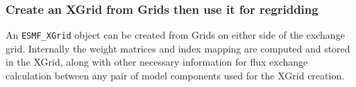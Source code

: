  
\setlength{\oldparskip}{\parskip}
\setlength{\parskip}{1.5ex}
\setlength{\oldparindent}{\parindent}
\setlength{\parindent}{0pt}
\setlength{\oldbaselineskip}{\baselineskip}
\setlength{\baselineskip}{11pt}
 
\def\bv{\begin{verbatim}}
\def\ev{\end{verbatim}}
\def\be{\begin{equation}}
\def\ee{\end{equation}}
\def\bea{\begin{eqnarray}}
\def\eea{\end{eqnarray}}
\def\bi{\begin{itemize}}
\def\ei{\end{itemize}}
\def\bn{\begin{enumerate}}
\def\en{\end{enumerate}}
\def\bd{\begin{description}}
\def\ed{\end{description}}
\def\({\left (}
\def\){\right )}
\def\[{\left [}
\def\]{\right ]}
\def\<{\left  \langle}
\def\>{\right \rangle}
\def\cI{{\cal I}}
\def\diag{\mathop{\rm diag}}
\def\tr{\mathop{\rm tr}}


 

  \subsubsection{Create an XGrid from Grids then use it for regridding}
  \label{sec:xgrid:usage:xgrid_create}
  
   An {\tt ESMF\_XGrid} object can be created from Grids on either side
   of the exchange grid. Internally the
   weight matrices and index mapping are computed and stored in the XGrid, along
   with other necessary information for flux exchange calculation between
   any pair of model components used for the XGrid creation.
  

